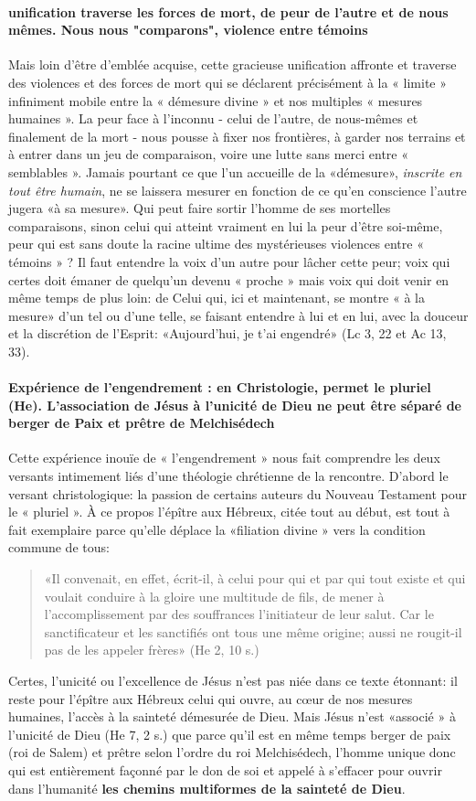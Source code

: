 \paragraph{unification traverse les forces de mort, de peur de l'autre et de nous mêmes. Nous nous "comparons", violence entre témoins}
Mais loin d'être d'emblée acquise, cette gracieuse unification affronte et traverse des violences et des forces de mort qui se déclarent précisément à la « limite » infiniment mobile entre la « démesure divine » et nos multiples « mesures humaines ». La peur face à l'inconnu
- celui de l'autre, de nous-mêmes et finalement de la mort - nous pousse à fixer nos frontières, à garder nos terrains et à entrer dans un jeu de comparaison, voire une lutte sans merci entre « semblables ». Jamais pourtant ce que l'un accueille de la «démesure», \textit{inscrite en tout être humain}, ne se laissera mesurer en fonction de ce qu'en conscience l'autre jugera «à sa mesure». Qui peut faire sortir l'homme de ses mortelles comparaisons, sinon celui qui atteint vraiment en lui la peur d'être soi-même, peur qui est sans doute la racine ultime des mystérieuses violences entre « témoins » ? Il faut entendre la voix d'un autre pour lâcher cette peur; voix qui certes doit émaner de quelqu'un devenu « proche » mais voix qui doit venir en même temps de plus loin: de Celui qui, ici et maintenant, se montre « à la mesure» d'un tel ou d'une telle, se faisant entendre à lui et en lui, avec la douceur et la discrétion
de l'Esprit: «Aujourd'hui, je t'ai engendré» (Lc 3, 22 et Ac 13, 33).

\paragraph{Expérience de l'engendrement : en Christologie, permet le pluriel (He). L'association  de Jésus à l'unicité de Dieu ne peut être séparé de berger de Paix et prêtre de Melchisédech}
Cette expérience inouïe de « l'engendrement » nous fait comprendre les deux versants intimement liés d'une théologie chrétienne de la rencontre. D'abord le versant christologique: la passion de certains auteurs du Nouveau Testament pour le « pluriel ». À ce propos l'épître aux Hébreux, citée tout au début, est tout à fait exemplaire parce qu'elle déplace la «filiation divine » vers la condition commune de tous: \begin{quote}
    «Il convenait, en effet, écrit-il, à celui pour qui et par qui tout existe et qui voulait conduire à la gloire une multitude de fils, de mener à l'accomplissement par des souffrances l'initiateur de leur salut. Car le sanctificateur et les sanctifiés ont tous une même origine; aussi ne rougit-il pas de les appeler frères» (He 2, 10 s.)
\end{quote}
Certes, l'unicité ou l'excellence de Jésus n'est pas niée dans ce texte étonnant: il reste pour l'épître aux Hébreux celui qui ouvre, au cœur de nos mesures humaines, l'accès à la sainteté démesurée de Dieu. Mais Jésus n'est «associé » à l'unicité de Dieu (He 7, 2 s.) que parce qu'il est en même temps berger de paix (roi de Salem) et prêtre selon l'ordre du roi Melchisédech, l'homme unique donc qui est entièrement façonné par le don de soi et appelé à s'effacer pour ouvrir dans l'humanité \textbf{les chemins multiformes de la sainteté de Dieu}.
